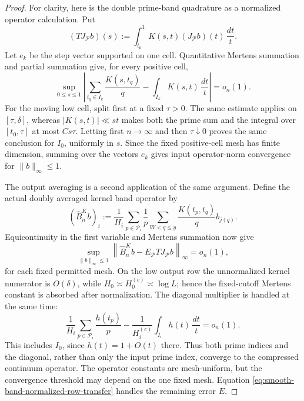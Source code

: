 \documentclass[11pt]{article}
\numberwithin{equation}{section}
\theoremstyle{definition}
\theoremstyle{remark}
\newcommand{\1}{\mathbf 1}
\begin{document}
\begin{proof}
For clarity, here is the double prime-band quadrature as a normalized
operator calculation.  Put
\[
 (TJ_{\mathcal P}b)(s):=\int_{t_0}^1
       K(s,t)(J_{\mathcal P}b)(t)\,\frac{dt}{t}.
\]
Let \(e_k\) be the step vector supported on one cell.  Quantitative
Mertens summation and partial summation give, for every positive cell,
\[
 \sup_{0\leq s\leq1}\left|
  \sum_{t_q\in I_k}\frac{K(s,t_q)}q
  -\int_{I_k}K(s,t)\,\frac{dt}{t}\right|=o_n(1).
\]
For the moving low cell, split first at a fixed \(\tau>0\).  The same
estimate applies on \([\tau,\delta]\), whereas
\(|K(s,t)|\ll st\) makes both the prime sum and the integral over
\([t_0,\tau]\) at most \(Cs\tau\).  Letting first \(n\to\infty\)
and then \(\tau\downarrow0\) proves the same conclusion for \(I_0\),
uniformly in \(s\).  Since the fixed positive-cell mesh has finite
dimension, summing over the vectors \(e_k\) gives input
operator-norm convergence for \(\|b\|_\infty\leq1\).

The output averaging is a second application of the same argument.  Define
the actual doubly averaged kernel band operator by
\[
 (\widehat B_n^K b)_i:=\frac1{H_i}
   \sum_{p\in\mathcal P_i}\frac1p
   \sum_{W<q\leq y}\frac{K(t_p,t_q)}q b_{j(q)}.
\]
Equicontinuity in the first variable and Mertens summation now give
\begin{equation}
 \sup_{\|b\|_\infty\leq1}
 \left\|\widehat B_n^K b
       -E_{\mathcal P}TJ_{\mathcal P}b\right\|_\infty=o_n(1),
 \label{eq:smooth-collective-compact-quadrature}
\end{equation}
for each fixed permitted mesh.  On the low output row the unnormalized
kernel numerator is \(O(\delta)\), while
\(H_0\asymp H_0^{(c)}\asymp\log L\); hence the fixed-cutoff Mertens
constant is absorbed after normalization.  The diagonal multiplier is
handled at the same time:
\[
 \frac1{H_i}\sum_{p\in\mathcal P_i}\frac{h(t_p)}p
 -\frac1{H_i^{(c)}}\int_{I_i}h(t)\,\frac{dt}{t}=o_n(1).
\]
This includes \(I_0\), since \(h(t)=1+O(t)\) there.  Thus both prime
indices and the diagonal, rather than only the input prime index,
converge to the compressed continuum operator.  The operator constants
are mesh-uniform, but the convergence threshold may depend on the one
fixed mesh.  Equation \eqref{eq:smooth-band-normalized-row-transfer}
handles the remaining error \(E\).


\end{proof}
\end{document}
